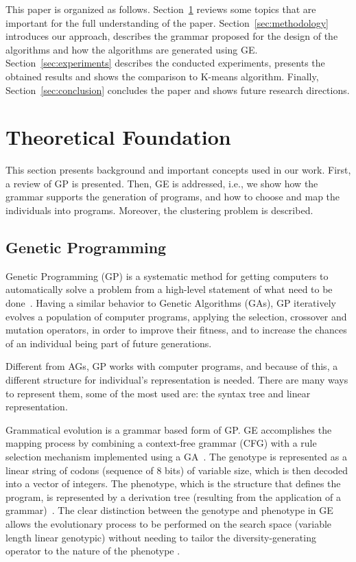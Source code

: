 \documentclass[conference]{IEEEtran}
\begin{document}
	This paper is organized as follows. Section~\ref{sec:theoretical_foudation} reviews some topics that are important for the full understanding of the paper. Section~\ref{sec:methodology} introduces our approach,  describes the grammar proposed for the design of the algorithms and how the algorithms are generated using GE. Section~\ref{sec:experiments} describes the conducted experiments,  presents the obtained results and shows the comparison to K-means algorithm. Finally, Section~\ref{sec:conclusion} concludes the paper and shows future research directions.
	
	
	\section{Theoretical Foundation} \label{sec:theoretical_foudation}
	
	
	This section presents background and important concepts used in our work. First, a review of GP is presented. Then, GE is addressed, i.e., we show how the grammar supports the generation of programs, and how to choose and map the individuals into programs. Moreover, the clustering problem is described.
	
	
	\subsection{Genetic Programming}
	
	
	Genetic Programming (GP) is a systematic method for getting computers to automatically solve a problem from a high-level statement of what need to be done~\cite{koza2005genetic}. Having a similar behavior to Genetic Algorithms (GAs), GP iteratively evolves a population of computer programs, applying the selection, crossover and mutation operators, in order to improve their fitness, and to increase the chances of an individual being part of future generations.
	
	
	Different from AGs, GP works with computer programs, and because of this, a different structure for individual's representation is needed. There are many ways to represent them, some of the most used are: the syntax tree and linear representation.
	
	
	
	Grammatical evolution is a grammar based form of GP. GE accomplishes the mapping process by combining a context-free grammar (CFG) with a rule selection mechanism implemented using a GA~\cite{ryan1998grammatical}. The genotype is represented as a linear string of codons (sequence of 8 bits) of variable size, which is then decoded into a vector of integers. The phenotype, which is the structure that defines the program, is represented by a derivation tree (resulting from the application of a grammar)~\cite{cerri2013grammatical}. The clear distinction between the genotype and phenotype in GE allows the evolutionary process to be performed on the search space (variable length linear genotypic) without needing to tailor the diversity-generating operator to the nature of the phenotype \cite{sabar2013grammatical}.
	
\end{document}
